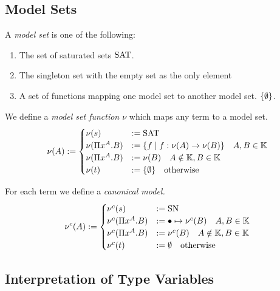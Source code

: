 \subsection{Model Sets}

\begin{definition}
    A {\em model set} is one of the following:
    \begin{enumerate}
    \item The set of saturated sets $\SAT$.

    \item The singleton set with the empty set as the only element

    \item A set of functions mapping one model set to another model set.
        $\set{\empty}$.
    \end{enumerate}
\end{definition}

\begin{definition}
    We define a {\em model set function $\nu$} which maps any term to a model
    set. 
  $$
  \nu(A) :=
  \begin{cases}
      \nu(s) &:= \SAT
    \\
      \nu(\Pi x^A.B) &:= \{ f \mid f:\nu(A) \to \nu(B)\} \quad A,B \in \Kinds
    \\
      \nu(\Pi x^A.B) &:= \nu(B) \quad A \notin \Kinds, B \in \Kinds
    \\
      \nu(t) &:= \set{empty} \quad \text{otherwise}
  \end{cases}
  $$
\end{definition}


\begin{definition}
    For each term we define a \em{canonical model}.
  $$
  \nu^c(A) :=
  \begin{cases}
      \nu^c(s) &:= \SN
    \\
      \nu^c(\Pi x^A. B) &:= \bullet \mapsto \nu^c(B) \quad A,B \in \Kinds
    \\
      \nu^c(\Pi x^A. B) &:= \nu^c(B) \quad A \notin \Kinds, B \in \Kinds
    \\
      \nu^c (t) &:= \emptyset \quad \text{otherwise}
  \end{cases}
  $$
\end{definition}



\subsection{Interpretation of Type Variables}


